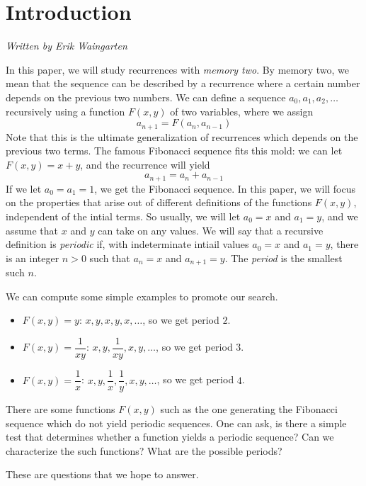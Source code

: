 \documentclass[12pt]{article}
\begin{document}
\maketitle

\section{Introduction}
\emph{Written by Erik Waingarten}

In this paper, we will study recurrences with \textit{memory two}. By memory two, we mean that the sequence can be described by a recurrence where a certain number depends on the previous two numbers. We can define a sequence $a_0, a_1, a_2, \dots$ recursively using a function $F(x,y)$ of two variables, where we assign
\[ a_{n+1} = F(a_n, a_{n-1}) \]
Note that this is the ultimate generalization of recurrences which depends on the previous two terms. The famous Fibonacci sequence fits this mold: we can let $F(x,y) = x + y$, and the recurrence will yield
\[ a_{n+1} = a_n + a_{n-1} \]
If we let $a_0 = a_1 = 1$, we get the Fibonacci sequence. In this paper, we will focus on the properties that arise out of different definitions of the functions $F(x,y)$, independent of the intial terms. So usually, we will let $a_0 = x$ and $a_1 = y$, and we assume that $x$ and $y$ can take on any values. We will say that a recursive definition is \textit{periodic} if, with indeterminate intiail values $a_0 = x$ and $a_1 = y$, there is an integer $n>0$ such that $a_n = x$ and $a_{n+1} = y$. The \emph{period} is the smallest such $n$. 

We can compute some simple examples to promote our search. 
\begin{itemize}
\item $F(x,y) = y$: $x, y, x, y, x, \dots$, so we get period $2$.
\item $F(x,y) = \dfrac{1}{xy}$: $x, y, \dfrac{1}{xy}, x, y, \dots$, so we get period $3$.
\item $F(x,y) = \dfrac{1}{x}$: $x, y, \dfrac{1}{x}, \dfrac{1}{y}, x, y, \dots$, so we get period $4$.
\end{itemize}

There are some functions $F(x,y)$ such as the one generating the Fibonacci sequence which do not yield periodic sequences. One can ask, is there a simple test that determines whether a function yields a periodic sequence? Can we characterize the such functions? What are the possible periods?

These are questions that we hope to answer. 
\end{document}
